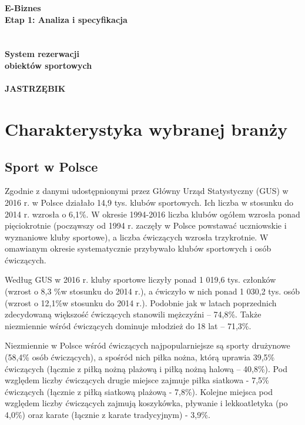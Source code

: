 \documentclass[a4paper,11pt]{article}
\begin{document}
\begin{titlepage}
\begin{center}
\textbf{\huge{E-Biznes}}
\textbf{\LARGE{\\Etap 1: Analiza i specyfikacja}}
\textbf{\Huge{\\~\\~\\System rezerwacji\\obiektów sportowych\\~\\ JASTRZĘBIK}} 
\end{center}

\end{titlepage}

\setcounter{page}{2}

\tableofcontents
{}
\newpage

\section{Charakterystyka wybranej branży}

    \subsection{Sport w Polsce}
    
    Zgodnie z danymi udostępnionymi przez Główny Urząd Statystyczny (GUS) w 2016 r. w Polsce działało 14,9 tys. klubów sportowych. Ich liczba w stosunku do 2014 r. wzrosła o 6,1\%. W okresie 1994-2016 liczba klubów ogółem wzrosła ponad pięciokrotnie (począwszy od 1994 r. zaczęły w Polsce powstawać uczniowskie i wyznaniowe kluby sportowe), a liczba ćwiczących wzrosła trzykrotnie. W omawianym okresie systematycznie przybywało klubów sportowych i osób ćwiczących. 
    
    Według GUS w 2016 r. kluby sportowe liczyły ponad 1 019,6 tys. członków (wzrost o 8,3 \%w stosunku do 2014 r.), a ćwiczyło w nich ponad 1 030,2 tys. osób (wzrost o 12,1\%w stosunku do 2014 r.). Podobnie jak w latach poprzednich zdecydowaną większość ćwiczących stanowili mężczyźni – 74,8\%. Także niezmiennie wśród ćwiczących dominuje młodzież do 18 lat – 71,3\%. 

    Niezmiennie w Polsce wśród ćwiczących najpopularniejsze są sporty drużynowe (58,4\% osób ćwiczących), a spośród nich piłka nożna, którą uprawia 39,5\% ćwiczących (łącznie z piłką nożną plażową i piłką nożną halową – 40,8\%). Pod względem liczby ćwiczących drugie miejsce zajmuje piłka siatkowa - 7,5\% ćwiczących (łącznie z piłką siatkową plażową - 7,8\%). Kolejne miejsca pod względem liczby ćwiczących zajmują koszykówka, pływanie i lekkoatletyka (po 4,0\%) oraz karate (łącznie z karate tradycyjnym) - 3,9\%. 
\end{document}
